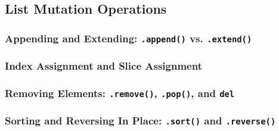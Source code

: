 \subsection{List Mutation Operations}
\subsubsection{Appending and Extending: \texttt{.append()} vs. \texttt{.extend()}}
\subsubsection{Index Assignment and Slice Assignment}
\subsubsection{Removing Elements: \texttt{.remove()}, \texttt{.pop()}, and \texttt{del}}
\subsubsection{Sorting and Reversing In Place: \texttt{.sort()} and \texttt{.reverse()}}
